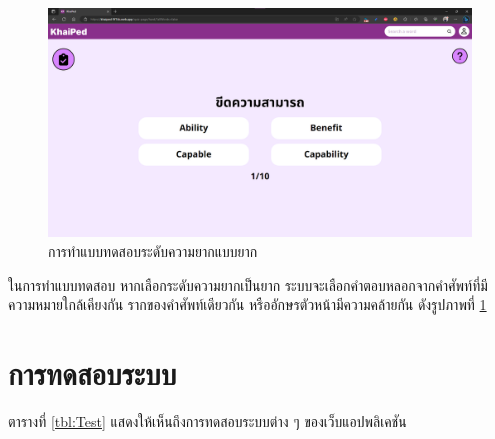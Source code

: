 \documentclass[12pt,oneside,openright,a4paper]{cpe-thai-project}
\begin{document}
\begin{figure}[!h]\centering
	\includegraphics[width=\textwidth, keepaspectratio=true]{image/chap4/Final/quiz hard.png}
	\caption{{การทำแบบทดสอบระดับความยากแบบยาก}}\label{fig:chap4FinQuizHard}
\end{figure}
\hspace{1cm}
ในการทำแบบทดสอบ หากเลือกระดับความยากเป็นยาก ระบบจะเลือกคำตอบหลอกจากคำศัพท์ที่มีความหมายใกล้เคียงกัน
รากของคำศัพท์เดียวกัน หรืออักษรตัวหน้ามีความคล้ายกัน ดังรูปภาพที่ \ref{fig:chap4FinQuizHard}

\pagebreak
\section{การทดสอบระบบ}
\hspace{1cm}
ตารางที่ \ref{tbl:Test} แสดงให้เห็นถึงการทดสอบระบบต่าง ๆ ของเว็บแอปพลิเคชัน 
\end{document}
